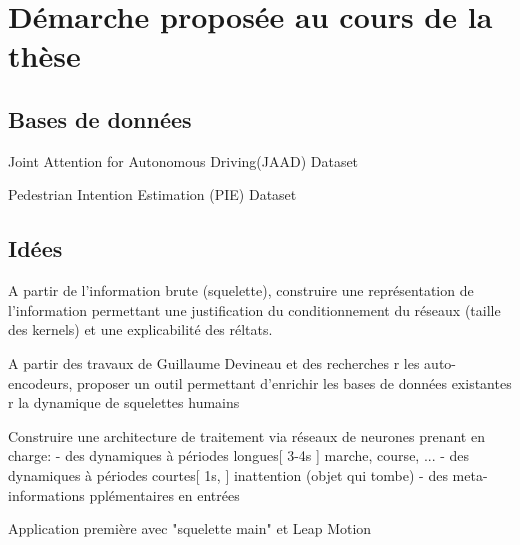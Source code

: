 \clearpage
\chapter{Démarche proposée au cours de la thèse}
\label{sec:SOTA}

\section{Bases de données}
Joint Attention for Autonomous Driving(JAAD) Dataset \cite{2016arXiv160904741K,Rasouli_2017_ICCV}

Pedestrian Intention Estimation (PIE) Dataset \cite{Rasouli2019PIE}

\section{Idées}

A partir de l'information brute (squelette), construire une représentation de l'information permettant une justification du conditionnement du réseaux (taille des kernels) et une explicabilité des réltats.

A partir des travaux de Guillaume Devineau et des recherches r les auto-encodeurs, proposer un outil permettant d'enrichir les bases de données existantes r la dynamique de squelettes humains


Construire une architecture de traitement via réseaux de neurones prenant en charge:
- des dynamiques à périodes longues[ 3-4s ] marche, course, ...
- des dynamiques à périodes courtes[ 1s, ] inattention (objet qui tombe)
- des meta-informations pplémentaires en entrées

Application première avec "squelette main" et Leap Motion